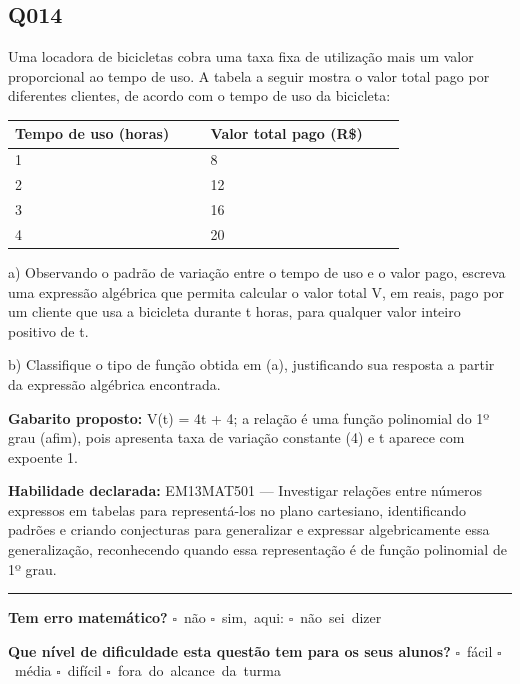 \documentclass[11pt,a4paper]{article}
\begin{document}
\begin{samepage}
\subsection*{Q014}
Uma locadora de bicicletas cobra uma taxa fixa de utilização mais um valor proporcional ao tempo de uso. A tabela a seguir mostra o valor total pago por diferentes clientes, de acordo com o tempo de uso da bicicleta:

\begin{center}
\begin{tabular}{|p{0.430\linewidth}|p{0.430\linewidth}|}
\hline
\textbf{Tempo de uso (horas)} & \textbf{Valor total pago (R\$)} \\
\hline
1 & 8 \\
\hline
2 & 12 \\
\hline
3 & 16 \\
\hline
4 & 20 \\
\hline
\end{tabular}
\end{center}

a) Observando o padrão de variação entre o tempo de uso e o valor pago, escreva uma expressão algébrica que permita calcular o valor total V, em reais, pago por um cliente que usa a bicicleta durante t horas, para qualquer valor inteiro positivo de t.

b) Classifique o tipo de função obtida em (a), justificando sua resposta a partir da expressão algébrica encontrada.

\textbf{Gabarito proposto:} V(t) = 4t + 4; a relação é uma função polinomial do 1º grau (afim), pois apresenta taxa de variação constante (4) e t aparece com expoente 1.

\textbf{Habilidade declarada:} EM13MAT501 --- Investigar relações entre números expressos em tabelas para representá-los no plano cartesiano, identificando padrões e criando conjecturas para generalizar e expressar algebricamente essa generalização, reconhecendo quando essa representação é de função polinomial de 1º grau.
\end{samepage}

\noindent\rule{\linewidth}{0.4pt}
\textbf{Tem erro matemático?}\quad
\mbox{$\square$~não} \quad \mbox{$\square$~sim, aqui:} \underline{\hspace{5cm}}
\quad \mbox{$\square$~não sei dizer}

\textbf{Que nível de dificuldade esta questão tem para os seus alunos?}\quad
\mbox{$\square$~fácil} \quad \mbox{$\square$~média} \quad
\mbox{$\square$~difícil} \quad \mbox{$\square$~fora do alcance da turma}
\end{document}
